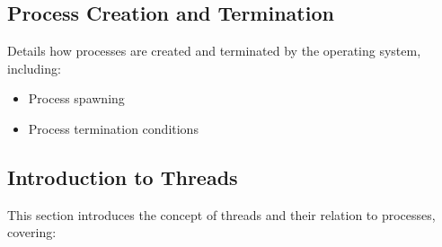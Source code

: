\documentclass[12pt]{article}
\begin{document}
\subsection{Process Creation and Termination}
Details how processes are created and terminated by the operating system, including:
\begin{itemize}
    \item Process spawning
    \item Process termination conditions
\end{itemize}

\subsection{Introduction to Threads}
This section introduces the concept of threads and their relation to processes, covering:
\end{document}
